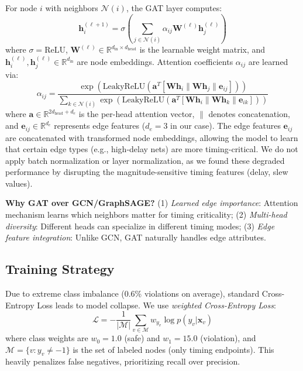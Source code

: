 \documentclass[10pt,twocolumn,journal]{IEEEtran}
\begin{document}
For node $i$ with neighbors $\mathcal{N}(i)$, the GAT layer computes:
\begin{equation}
\mathbf{h}_i^{(\ell+1)} = \sigma \left( \sum_{j \in \mathcal{N}(i)} \alpha_{ij} \mathbf{W}^{(\ell)} \mathbf{h}_j^{(\ell)} \right)
\label{eq:gat_update}
\end{equation}
where $\sigma = \text{ReLU}$, $\mathbf{W}^{(\ell)} \in \mathbb{R}^{d_{\text{in}} \times d_{\text{head}}}$ is the learnable weight matrix, and $\mathbf{h}_i^{(\ell)}, \mathbf{h}_j^{(\ell)} \in \mathbb{R}^{d_{\text{in}}}$ are node embeddings. Attention coefficients $\alpha_{ij}$ are learned via:
\begin{equation}
\alpha_{ij} = \frac{\exp(\text{LeakyReLU}(\mathbf{a}^T [\mathbf{W}\mathbf{h}_i \| \mathbf{W}\mathbf{h}_j \| \mathbf{e}_{ij}]))}{\sum_{k \in \mathcal{N}(i)} \exp(\text{LeakyReLU}(\mathbf{a}^T [\mathbf{W}\mathbf{h}_i \| \mathbf{W}\mathbf{h}_k \| \mathbf{e}_{ik}]))}
\label{eq:attention}
\end{equation}
where $\mathbf{a} \in \mathbb{R}^{2d_{\text{head}} + d_e}$ is the per-head attention vector, $\|$ denotes concatenation, and $\mathbf{e}_{ij} \in \mathbb{R}^{d_e}$ represents edge features ($d_e=3$ in our case). The edge features $\mathbf{e}_{ij}$ are concatenated with transformed node embeddings, allowing the model to learn that certain edge types (e.g., high-delay nets) are more timing-critical. We do not apply batch normalization or layer normalization, as we found these degraded performance by disrupting the magnitude-sensitive timing features (delay, slew values).

\textbf{Why GAT over GCN/GraphSAGE?}
(1) \textit{Learned edge importance}: Attention mechanism learns which neighbors matter for timing criticality;
(2) \textit{Multi-head diversity}: Different heads can specialize in different timing modes;
(3) \textit{Edge feature integration}: Unlike GCN, GAT naturally handles edge attributes.

\subsection{Training Strategy}

Due to extreme class imbalance (0.6\% violations on average), standard Cross-Entropy Loss leads to model collapse. We use \textit{weighted Cross-Entropy Loss}:
\begin{equation}
\mathcal{L} = -\frac{1}{|\mathcal{M}|} \sum_{v \in \mathcal{M}} w_{y_v} \log p(y_v | \mathbf{x}_v)
\label{eq:loss}
\end{equation}
where class weights are $w_0 = 1.0$ (safe) and $w_1 = 15.0$ (violation), and $\mathcal{M} = \{v : y_v \neq -1\}$ is the set of labeled nodes (only timing endpoints). This heavily penalizes false negatives, prioritizing recall over precision.
\end{document}
